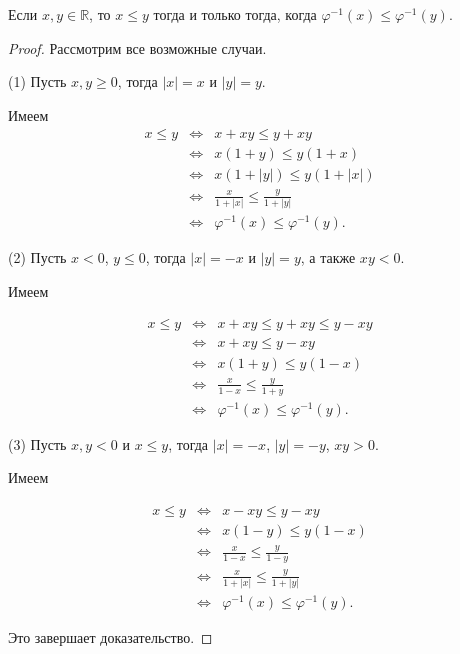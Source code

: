 \begin{lemma}\label{x<y->f(x)<f(x)}
    Если $x,y\in \mathbb{R}$, то $x\le y$ тогда и только тогда, когда $\varphi^{-1}(x) \le \varphi^{-1}(y)$.
\end{lemma}
\begin{proof}
Рассмотрим все возможные случаи.

(1) Пусть $x,y \ge 0$, тогда $|x| =x$ и $|y| = y$.

Имеем
\begin{eqnarray*}
    x \le y &\Longleftrightarrow& x+ xy \le y + xy \\
    & \Longleftrightarrow& x (1 + y) \le y(1 + x)\\
    &\Longleftrightarrow& x(1+ |y|) \le y (1+ |x|)\\
    &\Longleftrightarrow& \frac{x}{1+|x|} \le \frac{y}{1+|y|}\\
    &\Longleftrightarrow& \varphi^{-1}(x) \le \varphi^{-1}(y).
\end{eqnarray*}

(2) Пусть $x <0$, $y \le 0$, тогда $|x|  =- x$ и $|y| = y$, а также $xy < 0$.

Имеем

\begin{eqnarray*}
    x \le y &\Longleftrightarrow& x + xy \le  y+xy \le y -xy \\
    &\Longleftrightarrow& x+xy \le y - xy\\
    &\Longleftrightarrow& x(1+y) \le y(1-x) \\
    &\Longleftrightarrow& \frac{x}{1-x} \le \frac{y}{1+y}\\
    &\Longleftrightarrow& \varphi^{-1}(x) \le \varphi^{-1}(y).
\end{eqnarray*}

(3) Пусть $x,y < 0$ и $x\le y$, тогда $|x| = -x$, $|y| = -y$, $xy >0$.

Имеем

\begin{eqnarray*}
    x \le y &\Longleftrightarrow& x-xy \le y - xy \\
    &\Longleftrightarrow & x(1-y) \le y(1-x) \\
    &\Longleftrightarrow& \frac{x}{1-x} \le \frac{y}{1-y}\\
    &\Longleftrightarrow& \frac{x}{1+|x|} \le \frac{y}{1+ |y|} \\
     &\Longleftrightarrow& \varphi^{-1}(x) \le \varphi^{-1}(y).
\end{eqnarray*}

Это завершает доказательство.
\end{proof}

